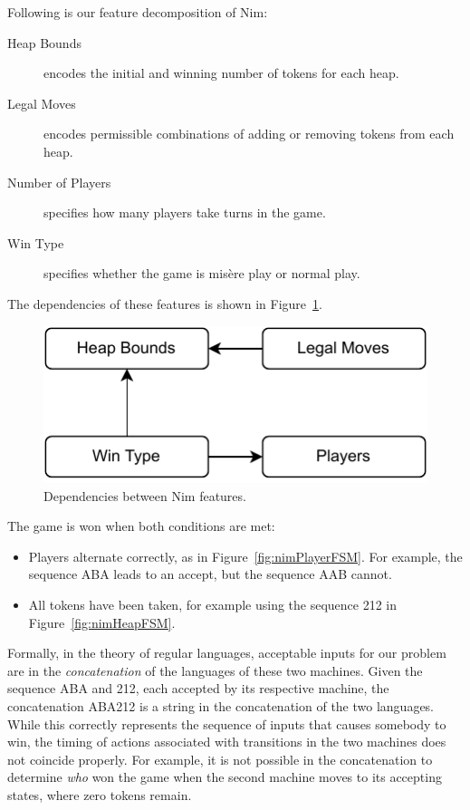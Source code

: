\documentclass[sigplan,anonymous,review]{acmart}
\begin{document}
Following is our feature decomposition of Nim:
\begin{description}
    \item[Heap Bounds] encodes the initial and winning number of tokens for each heap.
    \item[Legal Moves] encodes permissible combinations of adding or removing tokens from each heap.
    \item[Number of Players] specifies how many players take turns in the game.
    \item[Win Type] specifies whether the game is mis\`{e}re play or normal play.
\end{description}
The dependencies of these features is shown in Figure~\ref{fig:nimDependencies}.  

\begin{figure}
    \centering
    \includegraphics[width=0.6\linewidth]{figures/NimFeatures.pdf}
    \caption{Dependencies between Nim features.}
    \label{fig:nimDependencies}
\end{figure}


The game is won when both conditions are met:
\begin{itemize}
    \item Players alternate correctly, as in Figure~\ref{fig:nimPlayerFSM}.  For example, the sequence ABA leads to an accept, but the sequence AAB cannot.
    \item All tokens have been taken, for example using the sequence 212 in Figure~\ref{fig:nimHeapFSM}.
\end{itemize}
Formally, in the theory of regular languages, acceptable inputs for our problem are in the \emph{concatenation} of the languages of these two machines.   Given the sequence ABA and 212, each accepted by its respective machine, the concatenation ABA212 is a string in the concatenation of the two languages.  While this correctly represents the sequence of inputs that causes somebody to win, the timing of actions associated with transitions in the two machines does not coincide properly.  For example, it is not possible in the concatenation to determine \emph{who} won the game when the second machine moves to its accepting states, where zero tokens remain. 
\end{document}
